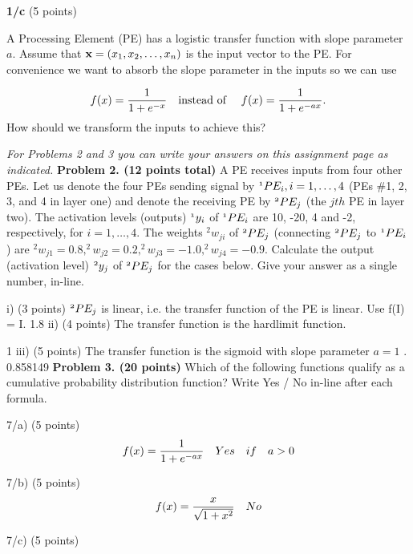 \documentclass[epsfig]{article}
\def\bpar{\vskip26pt}
\def\npar{\vskip13pt}
\def\spar{\vskip10pt}
\begin{document}
\centerline{\underline{\makebox[15cm][c]{}}}
\npar\npar
{\bf 1/c} (5 points)

A Processing Element (PE) has a logistic transfer function with slope parameter $a$. Assume that ${\bf x} = (x_1,x_2,\ldots ,x_n)$ is the input vector to the PE. For convenience we want to absorb the slope parameter in the inputs so we can use 

\begin{equation}
f(x) = {1\over 1 + e^{-x}} \quad\text{instead of }\quad f(x) = {1\over 1 + e^{-ax}} .
\end{equation}
\npar
How should we transform the inputs to achieve this?


\npar\bpar
{\it For Problems 2 and 3 you can write your answers on this assignment page as indicated.}
\spar
{\bf Problem 2. (12 points total)}
\spar
A PE receives inputs from four other PEs. Let us denote the four PEs sending signal by $^{\mit 1}PE_i, i=1,\ldots ,4$ (PEs \#1, 2, 3, and 4 in layer one) and denote the receiving PE by $^{\mit 2}PE_j$ (the $jth$ PE in layer two). The activation levels (outputs) $^{\mit1}y_i$ of $^{\mit1}PE_i$ are 10, -20, 4 and -2, respectively, for $ i=1,\ldots ,4$. The weights $^2w_{ji}$ of $^{\mit2}PE_j$ (connecting $^{\mit2}PE_j$ to $^{\mit1}PE_i$) are $^2w_{j1}=0.8,  ^2w_{j2}=0.2,  ^2w_{j3}=-1.0,  ^2w_{j4}=-0.9$. Calculate the output (activation level) $^{\mit 2}y_j$  of $^{\mit2}PE_j$ for the cases below. Give your answer as a single number, in-line.

\spar
i) (3 points) $^{\mit2}PE_j$ is linear, i.e. the transfer function of the PE is linear. Use f(I) = I.
\spar
1.8
\spar
ii) (4 points) The transfer function is the hardlimit function.  \spar

\spar
1
\spar
iii) (5 points) The transfer function is the sigmoid with slope parameter $a=1$ .
\spar
0.858149
\spar
\bpar\npar
{\bf Problem 3. (20 points)}
\spar
Which of the following functions qualify as a cumulative probability distribution function? Write Yes / No in-line after each formula.

\npar
7/a) (5 points)
\begin{equation}
f(x) = {1 \over 1 + e^{-ax}} \quad Yes \quad if\quad  a>0
\end{equation}
 
\npar
7/b) (5 points)
\begin{equation}
f(x) = {x \over \sqrt{1 + x^2}}  \quad No
\end{equation}

\npar 
7/c) (5 points)
\end{document}
